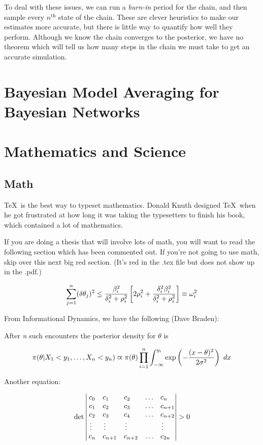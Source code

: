 \documentclass[12pt,twoside]{reedthesis}
\begin{document}
			To deal with these issues, we can run a {\em burn-in} period for the chain, and then sample every $n^{\text{th}}$ state of the chain. These are clever heuristics to make our estimates more accurate, but there is little way to quantify how well they perform. Although we know the chain converges to the posterior, we have no theorem which will tell us how many steps in the chain we must take to get an accurate simulation.

\chapter{Bayesian Model Averaging for Bayesian Networks}

\chapter{Mathematics and Science}	
\section{Math}
	\TeX\ is the best way to typeset mathematics. Donald Knuth designed \TeX\ when he got frustrated at how long it was taking the typesetters to finish his book, which contained a lot of mathematics. 
	
	If you are doing a thesis that will involve lots of math, you will want to read the following section which has been commented out. If you're not going to use math, skip over this next big red section. (It's red in the .tex file but does not show up in the .pdf.)
	
	$$\sum_{j=1}^n (\delta\theta_j)^2 \leq {{\beta_i^2}\over{\delta_i^2 + \rho_i^2}}
\left[ 2\rho_i^2 + {\delta_i^2\beta_i^2\over{\delta_i^2 + \rho_i^2}} \right] \equiv \omega_i^2
$$

From Informational Dynamics, we have the following (Dave Braden):

After {\it n} such encounters the posterior density for $\theta$ is

$$
\pi(\theta|X_1< y_1,\dots,X_n<y_n) \varpropto \pi(\theta) \prod_{i=1}^n\int_{-\infty}^{y_i}
   \exp\left(-{(x-\theta)^2\over{2\sigma^2}}\right)\ dx
$$



Another equation:

$$\det\left|\,\begin{matrix}%
c_0&c_1\hfill&c_2\hfill&\ldots&c_n\hfill\cr
c_1&c_2\hfill&c_3\hfill&\ldots&c_{n+1}\hfill\cr
c_2&c_3\hfill&c_4\hfill&\ldots&c_{n+2}\hfill\cr
\,\vdots\hfill&\,\vdots\hfill&
  \,\vdots\hfill&&\,\vdots\hfill\cr
c_n&c_{n+1}\hfill&c_{n+2}\hfill&\ldots&c_{2n}\hfill\cr
\end{matrix}\right|>0$$
\end{document}
